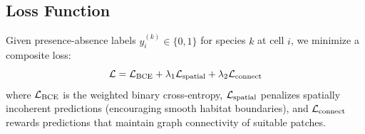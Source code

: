 \subsection{Loss Function}

Given presence-absence labels $y_i^{(k)} \in \{0, 1\}$ for species $k$
at cell $i$, we minimize a composite loss:
\begin{equation}
  \mathcal{L} = \mathcal{L}_{\text{BCE}} + \lambda_1 \mathcal{L}_{\text{spatial}} +
  \lambda_2 \mathcal{L}_{\text{connect}}
  \label{eq:loss}
\end{equation}
where $\mathcal{L}_{\text{BCE}}$ is the weighted binary cross-entropy,
$\mathcal{L}_{\text{spatial}}$ penalizes spatially incoherent predictions
(encouraging smooth habitat boundaries), and $\mathcal{L}_{\text{connect}}$
rewards predictions that maintain graph connectivity of suitable patches.


